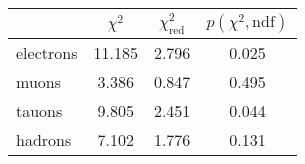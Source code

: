 \begin{tabular}{lS[table-format=2.3]S[table-format=1.3]S[table-format=1.3]}
	\toprule
	& {$\chi^2$} & {$\chi_\mathrm{red}^2$} & {$p(\chi^2, \mathrm{ndf})$} \\
	\midrule
	electrons & 11.185 & 2.796 & 0.025 \\
	muons & 3.386 & 0.847 & 0.495 \\
	tauons & 9.805 & 2.451 & 0.044\\
	hadrons & 7.102 & 1.776 & 0.131 \\
	\bottomrule
\end{tabular}
